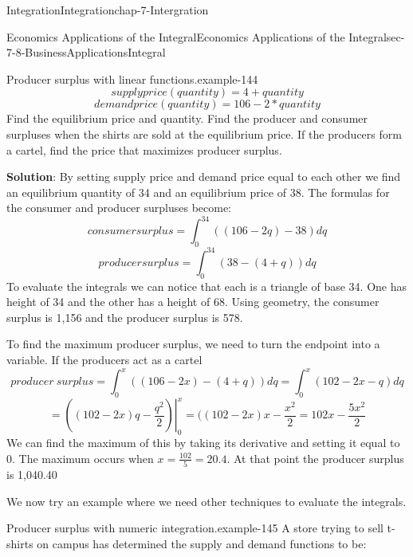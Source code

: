 \documentclass[oneside,10pt,]{book}
\newcommand{\terminology}[1]{\textbf{#1}}
\numberwithin{equation}{section}
\begin{document}
\begin{chapterptx}{Integration}{}{Integration}{}{}{chap-7-Intergration}
\begin{sectionptx}{Economics Applications of the Integral}{}{Economics Applications of the Integral}{}{}{sec-7-8-BusinessApplicationsIntegral}
\begin{example}{Producer surplus with linear functions.}{example-144}
%
\begin{equation*}
supply price(quantity)=4+quantity
\end{equation*}
%
\begin{equation*}
demand price(quantity)=106- 2*quantity
\end{equation*}
\hypertarget{p-3087}{}%
Find the equilibrium price and quantity.  Find the producer and consumer surpluses when the shirts are sold at the equilibrium price.  If the producers form a cartel, find the price that maximizes producer surplus.%
\par
\hypertarget{p-3088}{}%
\terminology{Solution}: By setting supply price and demand price equal to each other we find an equilibrium quantity of 34 and an equilibrium price of 38.  The formulas for the consumer and producer surpluses become:%
%
\begin{equation*}
consumer surplus= \int_0^{34} ((106-2q)-38)  dq
\end{equation*}
%
\begin{equation*}
producer surplus= \int_0^{34} ( 38-(4+q))  dq
\end{equation*}
\hypertarget{p-3089}{}%
To evaluate the integrals we can notice that each is a triangle of base 34.  One has height of 34 and the other has a height of 68.  Using geometry, the consumer surplus is \textdollar{}1,156 and the producer surplus is \textdollar{}578.%
\par
\hypertarget{p-3090}{}%
To find the maximum producer surplus, we need to turn the endpoint into a variable.  If the producers act as a cartel%
%
\begin{equation*}
producer\ surplus= \int_0^x ( (106-2x)-(4+q))  dq=\int_0^x ( 102-2x-q)  dq
\end{equation*}
%
\begin{equation*}
=\left.\left((102-2x)q-\frac{q^2}{2}\right) \right|_0^x=((102-2x)x-\frac{x^2}{2}=102x-\frac{5x^2}{2}
\end{equation*}
\hypertarget{p-3091}{}%
We can find the maximum of this by taking its derivative and setting it equal to 0.  The maximum occurs when \(x=\frac{102}{5}=20.4\).  At that point the producer surplus is \textdollar{}1,040.40%
\end{example}
\hypertarget{p-3092}{}%
We now try an example where we need other techniques to evaluate the integrals.%
\begin{example}{Producer surplus with numeric integration.}{example-145}%
\hypertarget{p-3093}{}%
A store trying to sell t-shirts on campus has determined the supply and demand functions to be:%

\end{example}
\end{sectionptx}
\end{chapterptx}
\end{document}
